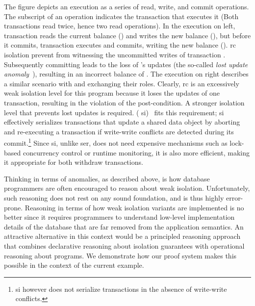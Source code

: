 The figure depicts an execution as a series of read, write, and commit
operations. The subscript of an operation indicates the transaction
that executes it (Both transactions read  twice, hence two read
operations). In the execution on left, transaction  reads the
current balance () and writes the new balance (), but
before it commits, transaction  executes and commits, writing
the new balance (). {\sc rc} isolation prevent  from
witnessing the uncommitted writes of transaction .
Subsequently committing  leads to the loss of 's updates
(the so-called \emph{lost update anomaly}~\cite{berenson}), resulting
in an incorrect balance of . The execution on right describes
a similar scenario with  and  exchanging their roles.
Clearly, {\sc rc} is an excessively weak isolation level for this
program because it loses the updates of one transaction, resulting in
the violation of the post-condition.  A stronger isolation level that
prevents lost updates is required.  ({\sc
si})~\cite{berenson} fits this requirement; {\sc si} effectively
serializes transactions that update a shared data object by aborting
and re-executing a transaction if write-write conflicts are detected
during its commit.\footnote{{\sc si} however does not serialize
transactions in the absence of write-write conflicts.} Since {\sc si},
unlike {\sc ser}, does not need expensive mechanisms such as
lock-based concurrency control or runtime monitoring, it is also more
efficient, making it appropriate for both withdraw transactions.

Thinking in terms of anomalies, as described above, is how database
programmers are often encouraged to reason about weak isolation.
Unfortunately, such reasoning does not rest on any sound foundation,
and is thus highly error-prone. Reasoning in terms of how weak
isolation variants are implemented is no better since it requires
programmers to understand low-level implementation details of the
database that are far removed from the application semantics. An
attractive  alternative in this context would be a principled
reasoning approach that combines declarative reasoning about isolation
guarantees with operational reasoning about programs. We demonstrate
how our proof system makes this possible in the context of the current
example.

